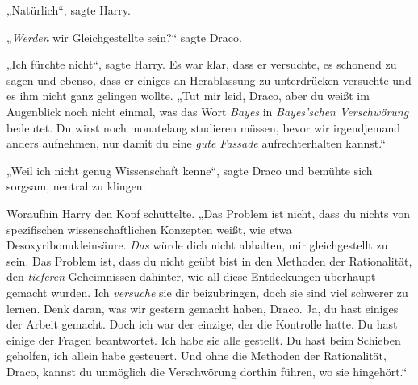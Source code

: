 „Natürlich“, sagte Harry.

„\emph{Werden} wir Gleichgestellte sein?“ sagte Draco.

„Ich fürchte nicht“, sagte Harry. Es war klar, dass er versuchte, es schonend zu sagen und ebenso, dass er einiges an Herablassung zu unterdrücken versuchte und es ihm nicht ganz gelingen wollte. „Tut mir leid, Draco, aber du weißt im Augenblick noch nicht einmal, was das Wort \emph{Bayes} in \emph{Bayes’schen Verschwörung} bedeutet. Du wirst noch monatelang studieren müssen, bevor wir irgendjemand anders aufnehmen, nur damit du eine \emph{gute Fassade} aufrechterhalten kannst.“

„Weil ich nicht genug Wissenschaft kenne“, sagte Draco und bemühte sich sorgsam, neutral zu klingen.

Woraufhin Harry den Kopf schüttelte. „Das Problem ist nicht, dass du nichts von spezifischen wissenschaftlichen Konzepten weißt, wie etwa Desoxyribonukleinsäure. \emph{Das} würde dich nicht abhalten, mir gleichgestellt zu sein. Das Problem ist, dass du nicht geübt bist in den Methoden der Rationalität, den \emph{tieferen} Geheimnissen dahinter, wie all diese Entdeckungen überhaupt gemacht wurden. Ich \emph{versuche} sie dir beizubringen, doch sie sind viel schwerer zu lernen. Denk daran, was wir gestern gemacht haben, Draco. Ja, du hast einiges der Arbeit gemacht. Doch ich war der einzige, der die Kontrolle hatte. Du hast einige der Fragen beantwortet. Ich habe sie alle gestellt. Du hast beim Schieben geholfen, ich allein habe gesteuert. Und ohne die Methoden der Rationalität, Draco, kannst du unmöglich die Verschwörung dorthin führen, wo sie hingehört.“

